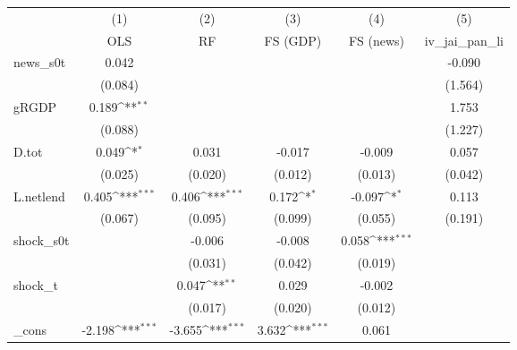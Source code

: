 {
\def\sym#1{\ifmmode^{#1}\else\(^{#1}\)\fi}
\begin{tabular}{l*{5}{c}}
\toprule
            &\multicolumn{1}{c}{(1)}&\multicolumn{1}{c}{(2)}&\multicolumn{1}{c}{(3)}&\multicolumn{1}{c}{(4)}&\multicolumn{1}{c}{(5)}\\
            &\multicolumn{1}{c}{OLS}&\multicolumn{1}{c}{RF}&\multicolumn{1}{c}{FS (GDP)}&\multicolumn{1}{c}{FS (news)}&\multicolumn{1}{c}{iv\_jai\_pan\_li}\\
\midrule
news\_s0t    &       0.042         &                     &                     &                     &      -0.090         \\
            &     (0.084)         &                     &                     &                     &     (1.564)         \\
\addlinespace
gRGDP       &       0.189\sym{**} &                     &                     &                     &       1.753         \\
            &     (0.088)         &                     &                     &                     &     (1.227)         \\
\addlinespace
D.tot       &       0.049\sym{*}  &       0.031         &      -0.017         &      -0.009         &       0.057         \\
            &     (0.025)         &     (0.020)         &     (0.012)         &     (0.013)         &     (0.042)         \\
\addlinespace
L.netlend   &       0.405\sym{***}&       0.406\sym{***}&       0.172\sym{*}  &      -0.097\sym{*}  &       0.113         \\
            &     (0.067)         &     (0.095)         &     (0.099)         &     (0.055)         &     (0.191)         \\
\addlinespace
shock\_s0t   &                     &      -0.006         &      -0.008         &       0.058\sym{***}&                     \\
            &                     &     (0.031)         &     (0.042)         &     (0.019)         &                     \\
\addlinespace
shock\_t     &                     &       0.047\sym{**} &       0.029         &      -0.002         &                     \\
            &                     &     (0.017)         &     (0.020)         &     (0.012)         &                     \\
\addlinespace
\_cons      &      -2.198\sym{***}&      -3.655\sym{***}&       3.632\sym{***}&       0.061         &                     \\

\end{tabular}}
